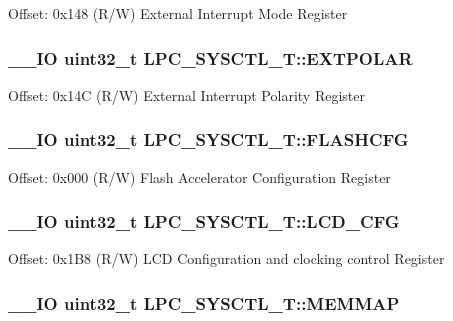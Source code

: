 Offset\+: 0x148 (R/\+W) External Interrupt Mode Register \hypertarget{struct_l_p_c___s_y_s_c_t_l___t_a7d0423c5e3f7482182c229bbc4b2b83b}{
\subsubsection[{E\+X\+T\+P\+O\+L\+A\+R}]{\setlength{\rightskip}{0pt plus 5cm}\+\_\+\+\_\+\+I\+O uint32\+\_\+t L\+P\+C\+\_\+\+S\+Y\+S\+C\+T\+L\+\_\+\+T\+::\+E\+X\+T\+P\+O\+L\+A\+R}}\label{struct_l_p_c___s_y_s_c_t_l___t_a7d0423c5e3f7482182c229bbc4b2b83b}
Offset\+: 0x14\+C (R/\+W) External Interrupt Polarity Register \hypertarget{struct_l_p_c___s_y_s_c_t_l___t_a8dcbc2e1c89d7bd42dbd19f66e2ddd8e}{
\subsubsection[{F\+L\+A\+S\+H\+C\+F\+G}]{\setlength{\rightskip}{0pt plus 5cm}\+\_\+\+\_\+\+I\+O uint32\+\_\+t L\+P\+C\+\_\+\+S\+Y\+S\+C\+T\+L\+\_\+\+T\+::\+F\+L\+A\+S\+H\+C\+F\+G}}\label{struct_l_p_c___s_y_s_c_t_l___t_a8dcbc2e1c89d7bd42dbd19f66e2ddd8e}
Offset\+: 0x000 (R/\+W) Flash Accelerator Configuration Register \hypertarget{struct_l_p_c___s_y_s_c_t_l___t_aef5d629c590fd35e8da2e061ddcdf17e}{
\subsubsection[{L\+C\+D\+\_\+\+C\+F\+G}]{\setlength{\rightskip}{0pt plus 5cm}\+\_\+\+\_\+\+I\+O uint32\+\_\+t L\+P\+C\+\_\+\+S\+Y\+S\+C\+T\+L\+\_\+\+T\+::\+L\+C\+D\+\_\+\+C\+F\+G}}\label{struct_l_p_c___s_y_s_c_t_l___t_aef5d629c590fd35e8da2e061ddcdf17e}
Offset\+: 0x1\+B8 (R/\+W) L\+C\+D Configuration and clocking control Register \hypertarget{struct_l_p_c___s_y_s_c_t_l___t_a5a5d2dc160a256a110878af0c2757a64}{
\subsubsection[{M\+E\+M\+M\+A\+P}]{\setlength{\rightskip}{0pt plus 5cm}\+\_\+\+\_\+\+I\+O uint32\+\_\+t L\+P\+C\+\_\+\+S\+Y\+S\+C\+T\+L\+\_\+\+T\+::\+M\+E\+M\+M\+A\+P}}\label{struct_l_p_c___s_y_s_c_t_l___t_a5a5d2dc160a256a110878af0c2757a64}
